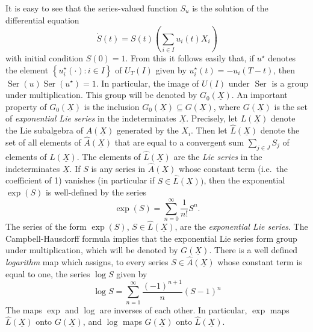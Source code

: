 \documentclass[leqno]{article}
\theoremstyle{plain}
\newcommand{\Ser}{\operatorname{Ser}}
\begin{document}
It is easy to see that the series-valued function $S_{u}$ is the solution of the differential equation
\begin{equation}
	\dot{S}(t)=S(t)\left(\sum_{i \in I} u_{i}(t) X_{i}\right)
\end{equation}
with initial condition $S(0)=1$. From this it follows easily that, if $u^{\star}$ denotes the element $\left\{u_{i}^{\star}(\cdot): i \in I\right\}$ of $U_{T}(I)$ given by $u_{i}^{\star}(t)=-u_{i}(T-t)$, then $\Ser(u) \Ser\left(u^{\star}\right)=1$. In particular, the image of $U(I)$ under $\Ser$ is a group under multiplication. This group will be denoted by $G_{0}(\underline{X})$. An important property of $G_{0}(\underline{X})$ is the inclusion $G_{0}(\underline{X}) \subseteq G(\underline{X})$, where $G(\underline{X})$ is the set of \emph{exponential Lie series} in the indeterminates $\underline{X}$. Precisely, let $L(\underline{X})$ denote the Lie subalgebra of $A(\underline{X})$ generated by the $X_{i}$. Then let $\hat{L}(\underline{X})$ denote the set of all elements of $\hat{A}(\underline{X})$ that are equal to a convergent sum $\sum_{j \in J} S_{j}$ of elements of $L(\underline{X})$. The elements of $\hat{L}(\underline{X})$ are the \emph{Lie series} in the indeterminates $\underline{X}$. If $S$ is any series in $\hat{A}(\underline{X})$ whose constant term (i.e.\ the coefficient of 1) vanishes (in particular if $S \in \hat{L}(\underline{X}))$, then the exponential $\exp(S)$ is well-defined by the series
\begin{equation}
	\exp (S)=\sum_{n=0}^{\infty} \frac{1}{n !} S^{n}.
\end{equation}
The series of the form $\exp (S)$, $S \in \hat{L}(\underline{X})$, are the \emph{exponential Lie series}. 
The Campbell-Hausdorff formula implies that the exponential Lie series form group under multiplication, which will be denoted by $G(\underline{X})$. 
There is a well defined \emph{logarithm} map which assigns, to every series $S \in \hat{A}(\underline{X})$ whose constant term is equal to one, the series $\log S$ given by
\begin{equation}
	\log S=\sum_{n=1}^{\infty} \frac{(-1)^{n+1}}{n}(S-1)^{n}
\end{equation}
The maps $\exp$ and $\log$ are inverses of each other. In particular, $\exp$ maps $\hat{L}(\underline{X})$ onto $G(\underline{X})$, and $\log$ maps $G(\underline{X})$ onto $\hat{L}(\underline{X})$.
\end{document}
